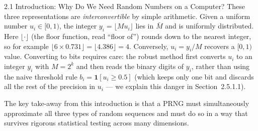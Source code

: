 \documentclass[aspectratio=169,10pt]{beamer}
\begin{document}
\begin{frame}[allowframebreaks]{2.1 Introduction: Why Do We Need Random Numbers on a Computer?}
These three representations are \emph{interconvertible} by simple arithmetic.
Given a uniform number $u_i \in [0,1)$, the integer
$y_i = \lfloor M u_i \rfloor$ lies in $\bar{M}$ and is uniformly distributed.
Here $\lfloor \cdot \rfloor$ (the floor function, read ``floor of'') rounds
down to the nearest integer, so for example $\lfloor 6 \times 0.731 \rfloor
= \lfloor 4.386 \rfloor = 4$.  Conversely, $u_i = y_i / M$ recovers a
$[0,1)$ value.  Converting to bits requires care: the robust method first
converts $u_i$ to an integer $y_i$ with $M = 2^k$ and then reads the binary
digits of $y_i$, rather than using the naive threshold rule
$b_i = \mathbf{1}[u_i \ge 0.5]$ (which keeps only one bit and discards all
the rest of the precision in $u_i$ --- we explain this danger in
Section~2.5.1.1).

\medskip
The key take-away from this introduction is that a PRNG must simultaneously
approximate all three types of random sequences and must do so in a way that
survives rigorous statistical testing across many dimensions.

\end{frame}
\end{document}
